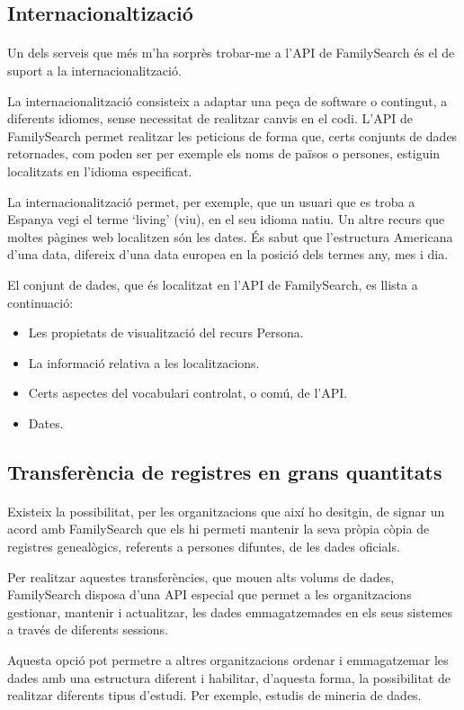     \subsection{Internacionaltizació}

        \paragraph{}
        Un dels serveis que més m'ha sorprès trobar-me a l'API de FamilySearch és el de suport a la internacionalització.

        La internacionalització consisteix a adaptar una peça de software o contingut, a diferents idiomes, sense necessitat de realitzar canvis en el codi. L'API de Family\-Search permet realitzar les peticions de forma que, certs conjunts de dades re\-tor\-na\-des, com poden ser per exemple els noms de països o persones, estiguin localitzats en l'idioma especificat.

        La internacionalització permet, per exemple, que un usuari que es troba a Espanya vegi el terme `living' (viu), en el seu idioma natiu. Un altre recurs que moltes pàgines web localitzen són les dates. És sabut que l'estructura Americana d'una data, difereix d'una data europea en la posició dels termes any, mes i dia.

        El conjunt de dades, que és localitzat en l'API de FamilySearch, es llista a continuació:

        \begin{itemize}
            \item Les propietats de visualització del recurs Persona.
            \item La informació relativa a les localitzacions.
            \item Certs aspectes del vocabulari controlat, o comú, de l'API.
            \item Dates.
        \end{itemize}


    \subsection{Transferència de registres en grans quantitats}

        \paragraph{}
        Existeix la possibilitat, per les organitzacions que així ho desitgin, de signar un acord amb FamilySearch que els hi permeti mantenir la seva pròpia còpia de registres genealògics, referents a persones difuntes, de les dades oficials.

        Per realitzar aquestes transferències, que mouen alts volums de dades, FamilySearch disposa d'una API especial que permet a les organitzacions gestionar, mantenir i actualitzar, les dades emmagatzemades en els seus sistemes a través de di\-fe\-rents sessions.

        Aquesta opció pot permetre a altres organitzacions ordenar i emmagatzemar les dades amb una estructura diferent i habilitar, d'aquesta forma, la possibilitat de realitzar diferents tipus d'estudi. Per exemple, estudis de mineria de dades.
